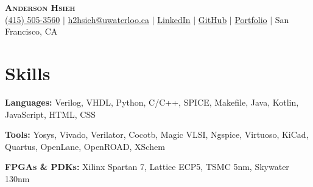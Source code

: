 \documentclass[letterpaper,11pt]{article}
\newcommand{\resumeSubHeadingListStart}{\begin{itemize}[leftmargin=0pt, label={}]}
\newcommand{\resumeSubHeadingListEnd}{\end{itemize}}
\newcommand{\resumeSectionName}[1]{\section{#1}\vspace{2pt}}
\begin{document}
\selectfont


\begin{center}
    \textbf{\Huge \scshape Anderson Hsieh} \\ \vspace{6pt}
    \small
    \faMobile \hspace{.5pt} \href{tel:6472360919}{(415) 505-3560}
    $|$
    \faAt \hspace{.5pt} \href{mailto:h2hsieh@uwaterloo.ca}{h2hsieh@uwaterloo.ca}
    $|$
    \faLinkedinSquare \hspace{.5pt} \href{https://www.linkedin.com/in/anderson-hsieh-6003a41ba/}{LinkedIn}
    $|$
    \faGithub \hspace{.5pt} \href{https://github.com/AndersonHsieh0330}{GitHub}
    $|$
    \faPictureO \hspace{.5pt} \href{https://docs.google.com/presentation/d/1Au0XCNEH63rdX4fkEn1Miv1jgYVPYybsGhhVmXHV-4A/edit?usp=sharing}{Portfolio}
    $|$
    \faMapMarker \hspace{.5pt} {San Francisco, CA}
\end{center}



\resumeSectionName{Skills}
  \resumeSubHeadingListStart
    \small{\item{
            \textbf{Languages: }{Verilog, VHDL, Python, C/C++, SPICE, Makefile, Java, Kotlin, JavaScript, HTML, CSS } \\ \vspace{2pt}

        \textbf{Tools: }{Yosys, Vivado, Verilator, Cocotb, Magic VLSI, Ngspice, Virtuoso, KiCad, Quartus, OpenLane, OpenROAD, XSchem} \\ \vspace{2pt}

        \textbf{FPGAs \& PDKs: }{Xilinx Spartan 7, Lattice ECP5, TSMC 5nm, Skywater 130nm} 
        }\\ \vspace{2pt}
    }
  \resumeSubHeadingListEnd
  
\end{document}
